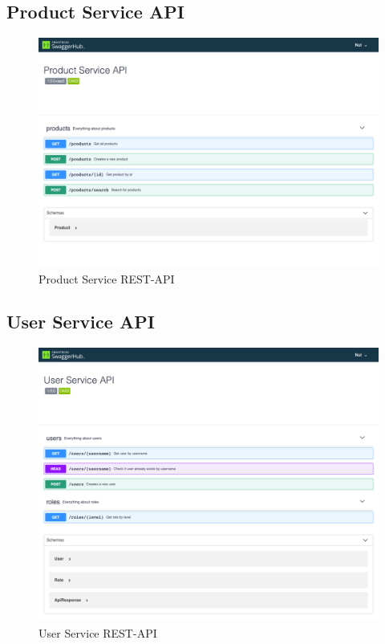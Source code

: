 \documentclass[12pt,a4paper]{article}
\begin{document}
	\subsection{Product Service API}
	\begin{figure}[H]
		\centering
		\includegraphics[scale=0.3]{img/swagger-product-service.png}
		\caption{Product Service REST-API}
	\end{figure}

	\subsection{User Service API}
	\begin{figure}[H]
		\centering
		\includegraphics[scale=0.3]{img/swagger-user-service.png}
		\caption{User Service REST-API}
	\end{figure}
\end{document}
